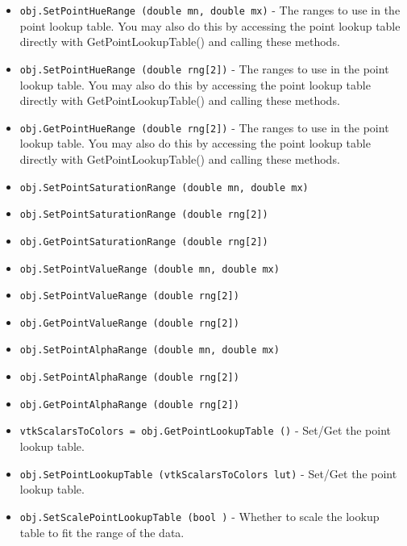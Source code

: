 \begin{itemize}
\item  \verb|obj.SetPointHueRange (double mn, double mx)| -  The ranges to use in the point lookup table.
 You may also do this by accessing the point lookup table directly
 with GetPointLookupTable() and calling these methods.

\item  \verb|obj.SetPointHueRange (double rng[2])| -  The ranges to use in the point lookup table.
 You may also do this by accessing the point lookup table directly
 with GetPointLookupTable() and calling these methods.

\item  \verb|obj.GetPointHueRange (double rng[2])| -  The ranges to use in the point lookup table.
 You may also do this by accessing the point lookup table directly
 with GetPointLookupTable() and calling these methods.

\item  \verb|obj.SetPointSaturationRange (double mn, double mx)|

\item  \verb|obj.SetPointSaturationRange (double rng[2])|

\item  \verb|obj.GetPointSaturationRange (double rng[2])|

\item  \verb|obj.SetPointValueRange (double mn, double mx)|

\item  \verb|obj.SetPointValueRange (double rng[2])|

\item  \verb|obj.GetPointValueRange (double rng[2])|

\item  \verb|obj.SetPointAlphaRange (double mn, double mx)|

\item  \verb|obj.SetPointAlphaRange (double rng[2])|

\item  \verb|obj.GetPointAlphaRange (double rng[2])|

\item  \verb|vtkScalarsToColors = obj.GetPointLookupTable ()| -  Set/Get the point lookup table.

\item  \verb|obj.SetPointLookupTable (vtkScalarsToColors lut)| -  Set/Get the point lookup table.

\item  \verb|obj.SetScalePointLookupTable (bool )| -  Whether to scale the lookup table to fit the range of the data.


\end{itemize}
